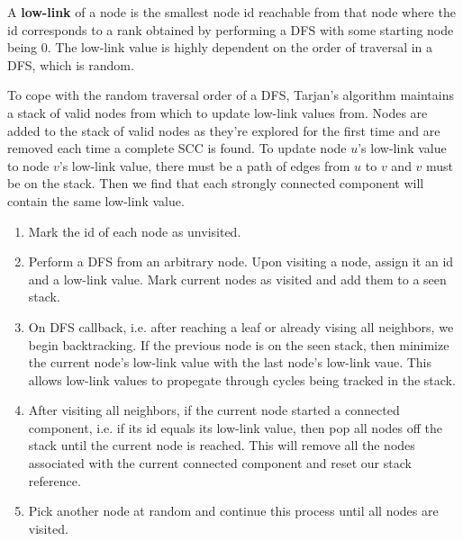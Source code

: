 \documentclass{article}
\begin{document}
    A \textbf{low-link} of a node is the smallest node id reachable from that node where the id corresponds to a rank obtained by performing a DFS with some starting node being 0. The low-link value is highly dependent on the order of traversal in a DFS, which is random.
    
    To cope with the random traversal order of a DFS, Tarjan's algorithm maintains a stack of valid nodes from which to update low-link values from. Nodes are added to the stack of valid nodes as they're explored for the first time and are removed each time a complete SCC is found. To update node $u$'s low-link value to node $v$'s low-link value, there must be a path of edges from $u$ to $v$ and $v$ must be on the stack. Then we find that each strongly connected component will contain the same low-link value. 
    
    \begin{enumerate}
        \item Mark the id of each node as unvisited.
        \item Perform a DFS from an arbitrary node. Upon visiting a node, assign it an id and a low-link value. Mark current nodes as visited and add them to a seen stack.
        \item On DFS callback, i.e. after reaching a leaf or already vising all neighbors, we begin backtracking. If the previous node is on the seen stack, then minimize the current node's low-link value with the last node's low-link vaue. This allows low-link values to propegate through cycles being tracked in the stack.
        \item After visiting all neighbors, if the current node started a connected component, i.e. if its id equals its low-link value, then pop all nodes off the stack until the current node is reached. This will remove all the nodes associated with the current connected component and reset our stack reference.
        \item Pick another node at random and continue this process until all nodes are visited.
    \end{enumerate}
\end{document}
